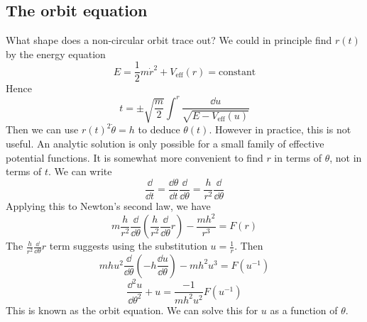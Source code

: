 \subsection{The orbit equation}
What shape does a non-circular orbit trace out?
We could in principle find \(r(t)\) by the energy equation
\[
	E = \frac{1}{2}m \dot r^2 + V_\text{eff}(r) = \text{constant}
\]
Hence
\[
	t = \pm \sqrt{\frac{m}{2}} \int^r \frac{\dd{u}}{\sqrt{E - V_\text{eff}(u)}}
\]
Then we can use \(r(t)^2\dot \theta = h\) to deduce \(\theta(t)\).
However in practice, this is not useful.
An analytic solution is only possible for a small family of effective potential functions.
It is somewhat more convenient to find \(r\) in terms of \(\theta\), not in terms of \(t\).
We can write
\[
	\frac{\dd}{\dd{t}} = \frac{\dd{\theta}}{\dd{t}} \frac{\dd}{\dd{\theta}} = \frac{h}{r^2} \frac{\dd}{\dd{\theta}}
\]
Applying this to Newton's second law, we have
\[
	m\frac{h}{r^2} \frac{\dd}{\dd{\theta}}\left( \frac{h}{r^2} \frac{\dd}{\dd{\theta}} r \right) - \frac{mh^2}{r^3} = F(r)
\]
The \(\frac{h}{r^2} \frac{\dd}{\dd{\theta}} r\) term suggests using the substitution \(u = \frac{1}{r}\).
Then
\[
	mhu^2 \frac{\dd}{\dd{\theta}}\left( -h\frac{\dd{u}}{\dd{\theta}} \right) - mh^2u^3 = F(u^{-1})
\]
\[
	\frac{\dd^2 u}{\dd{\theta}^2} + u = \frac{-1}{mh^2u^2}F(u^{-1})
\]
This is known as the orbit equation.
We can solve this for \(u\) as a function of \(\theta\).

